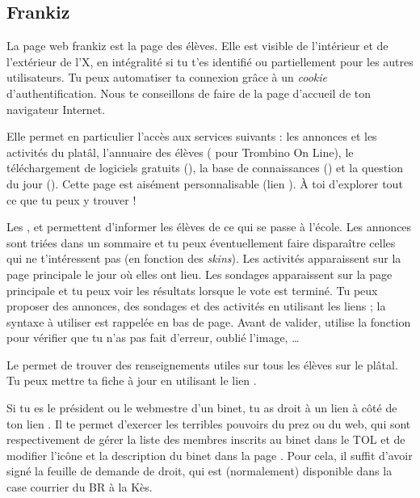 \subsection{Frankiz}
\label{frankiz} La page web frankiz est la page des \'el\`eves. Elle est visible de l'int\'erieur et de
l'ext\'erieur de l'X, en int\'egralit\'e si tu t'es identifi\'e ou partiellement pour les autres
utilisateurs. Tu peux automatiser ta connexion gr\^ace \`a  un \emph{cookie} d'authentification. Nous te
conseillons de faire de  la page d'accueil de ton navigateur Internet.

Elle permet en particulier l'acc\`es aux services suivants : les
annonces et les activit\'es du plat\^al, l'annuaire des \'el\`eves
( pour Trombino On Line), le t\'el\'echargement de logiciels
gratuits (), la base de connaissances () et
la question du jour (). Cette page est
ais\'ement personnalisable (lien ). \`A toi d'explorer
tout ce que tu peux y trouver !

Les ,  et  permettent d'informer les \'el\`eves de ce qui se passe \`a  l'\'ecole. Les annonces sont tri\'ees dans
un sommaire et tu peux \'eventuellement faire dispara\^itre celles qui ne t'int\'eressent pas (en fonction des \emph{skins}). Les activit\'es apparaissent
sur la page principale le jour o\`u elles ont lieu. Les sondages apparaissent sur la page principale et tu peux voir les
r\'esultats lorsque le vote est termin\'e. Tu peux proposer des annonces, des sondages et des activit\'es en utilisant les liens ; la syntaxe \`a  utiliser est
rappel\'ee en bas de page. Avant de valider, utilise la fonction  pour v\'erifier que tu n'as pas fait d'erreur, oubli\'e l'image, \dots

Le  permet de trouver des renseignements utiles sur
tous les \'el\`eves sur le pl\^atal. Tu peux mettre ta fiche \`a  jour en
utilisant le lien .

Si tu es le pr\'esident ou le webmestre d'un binet, tu as droit \`a  un
lien  \`a  c\^ot\'e de ton lien .
Il te permet d'exercer les terribles pouvoirs du prez ou du web, qui
sont respectivement de g\'erer la liste des membres inscrits au binet
dans le TOL et de modifier l'ic\^one et la description du binet dans
la page . Pour cela, il suffit d'avoir sign\'e la feuille
de demande de droit, qui est (normalement) disponible dans la case
courrier du BR \`a  la K\`es.

